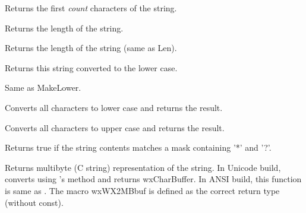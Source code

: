 \label{wxstringleft}


Returns the first {\it count} characters of the string.

\label{wxstringlen}


Returns the length of the string.

\label{wxstringlength}


Returns the length of the string (same as Len).

\label{wxstringlower}


Returns this string converted to the lower case.

\label{wxstringlowercase}


Same as MakeLower.

\label{wxstringmakelower}


Converts all characters to lower case and returns the result.

\label{wxstringmakeupper}


Converts all characters to upper case and returns the result.

\label{wxstringmatches}


Returns true if the string contents matches a mask containing '*' and '?'.

\label{wxstringmbstr}



Returns multibyte (C string) representation of the string.
In Unicode build, converts using 's 
method and returns wxCharBuffer. In ANSI build, this function is same
as .
The macro wxWX2MBbuf is defined as the correct return type (without const).

